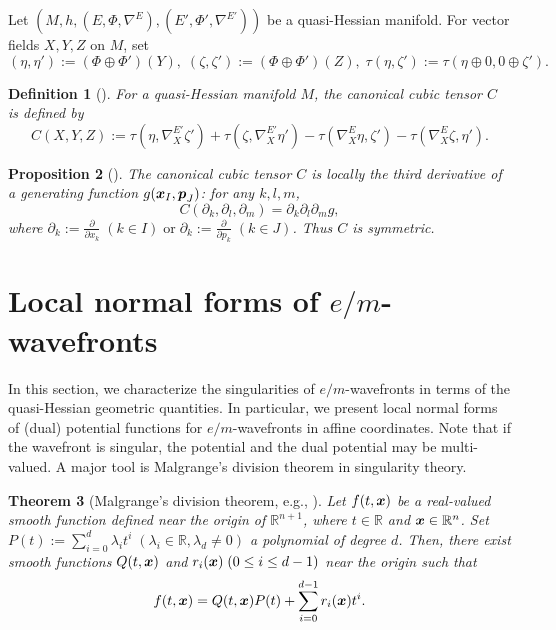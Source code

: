 \documentclass[10pt]{amsart}
\newcommand{\R}{\mathbb{R}}
\def\rd{\partial}
\def\bx{\mbox{\boldmath $x$}}
\def\bp{\mbox{\boldmath $p$}}
\newtheorem{thm}{\bf Theorem}[section]
\newtheorem{prop}[thm]{\bf Proposition}
\newtheorem{dfn}[thm]{\bf Definition}
\begin{document}
Let $(M,h,(E,\Phi, \nabla^E), (E', \Phi', \nabla^{E'}))$ be a quasi-Hessian manifold. For vector fields $X, Y, Z$ on $M$, set
$$(\eta,\eta'):=(\Phi\oplus\Phi')(Y),\;(\zeta,\zeta'):=(\Phi\oplus\Phi')(Z),\;\tau(\eta,\zeta'):=\tau(\eta\oplus 0,0\oplus\zeta').$$

\begin{dfn}[\cite{NT}]\upshape\label{cubic tensor}
For a quasi-Hessian manifold $M$, the {\em canonical cubic tensor} $C$ is defined by
$$C(X, Y, Z):=\tau(\eta, \nabla^{E'}_X\zeta')+\tau(\zeta, \nabla^{E'}_X\eta')
-\tau(\nabla^E_X\eta, \zeta')-\tau(\nabla^E_X\zeta, \eta').$$
\end{dfn}

\begin{prop}[\cite{NT}]\upshape
The canonical cubic tensor $C$ is locally the third derivative of a generating function $g(\bx_I, \bp_J)$: for any $k, l, m$, 
$$C(\rd_k, \rd_l, \rd_m)=\rd_k\rd_l\rd_m g,$$ 
where $\rd_k:=\frac{\rd}{\rd x_k}\; (k\in I) \;\mbox{or}\; \rd_k:=\frac{\rd}{\rd p_k}\; (k \in J)$. Thus $C$ is symmetric.
\end{prop}



\section{Local normal forms of $e/m$-wavefronts}\label{sec:normal forms}
In this section, we characterize the singularities of $e/m$-wavefronts in terms of the quasi-Hessian geometric quantities.  
In particular, we present local normal forms of  (dual) potential functions for $e/m$-wavefronts in affine coordinates. 
Note that if the wavefront is singular, the potential and the dual potential may be multi-valued. 
A major tool is  Malgrange's division theorem in singularity theory.

\begin{thm}[Malgrange's division theorem, e.g., \cite{AGV}]\label{Malgrange}
Let $f(t, \bx)$ be a real-valued smooth function defined near the origin of $\R^{n+1}$, where $t\in\R$ and $\bx\in\R^n$. Set $P(t) := \sum_{i=0}^d \lambda_i t^i\; (\lambda_i\in\R, \lambda_d\not=0)$ a polynomial of degree $d$. 
Then, there exist smooth functions $Q (t, \bx)$ and $r_i(\bx) \; (0\leq i\leq d-1)$ near the origin such that
$$f(t, \bx) = Q(t, \bx)P(t) + \sum_{i=0}^{d-1}r_i(\bx)t^i.$$
\end{thm}
\end{document}
